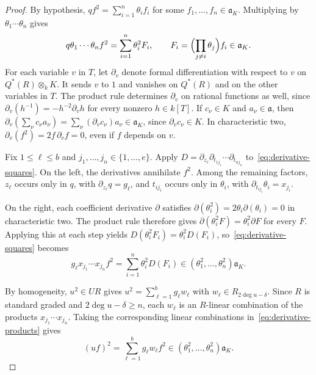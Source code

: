 \documentclass[a4paper,11pt]{amsart}
\newcommand{\kk}{k}
\theoremstyle{definition}
\begin{document}
\begin{proof}
By hypothesis, $qf^2=\sum_{i=1}^n\theta_i f_i$ for some $f_1,\ldots,f_n\in\mathfrak a_K$. Multiplying by $\theta_1\cdots\theta_n$ gives
\begin{equation}\label{eq:derivative-squares}
 q\theta_1\cdots\theta_n f^2=\sum_{i=1}^n\theta_i^2 F_i,\qquad F_i=\Bigl(\prod_{j\ne i}\theta_j\Bigr)f_i\in\mathfrak a_K.
\end{equation}
For each variable $v$ in $T$, let $\partial_v$ denote formal differentiation with respect to $v$ on $Q^*(R)\otimes_{\kk}K$. It sends $v$ to $1$ and vanishes on $Q^*(R)$ and on the other variables in $T$. The product rule determines $\partial_v$ on rational functions as well, since $\partial_v(h^{-1})=-h^{-2}\partial_v h$ for every nonzero $h\in\kk[T]$. If $c_\nu\in K$ and $a_\nu\in\mathfrak a$, then $\partial_v(\sum_\nu c_\nu a_\nu)=\sum_\nu(\partial_v c_\nu)a_\nu\in\mathfrak a_K$, since $\partial_v c_\nu\in K$. In characteristic two, $\partial_v(f^2)=2f\,\partial_v f=0$, even if $f$ depends on $v$.

Fix $1\leq\ell\leq b$ and $j_1,\ldots,j_n\in\{1,\ldots,e\}$. Apply $D=\partial_{z_\ell}\partial_{t_{1j_1}}\cdots\partial_{t_{nj_n}}$ to~\eqref{eq:derivative-squares}. On the left, the derivatives annihilate $f^2$. Among the remaining factors, $z_\ell$ occurs only in $q$, with $\partial_{z_\ell}q=g_\ell$, and $t_{ij_i}$ occurs only in $\theta_i$, with $\partial_{t_{ij_i}}\theta_i=x_{j_i}$.

On the right, each coefficient derivative $\partial$ satisfies $\partial(\theta_i^2)=2\theta_i\partial(\theta_i)=0$ in characteristic two. The product rule therefore gives $\partial(\theta_i^2 F)=\theta_i^2\partial F$ for every $F$. Applying this at each step yields $D(\theta_i^2 F_i)=\theta_i^2D(F_i)$, so~\eqref{eq:derivative-squares} becomes
\begin{equation}\label{eq:derivative-products}
 g_\ell x_{j_1}\cdots x_{j_n}f^2=\sum_{i=1}^n\theta_i^2D(F_i)\in(\theta_1^2,\ldots,\theta_n^2)\mathfrak a_K.
\end{equation}

By homogeneity, $u^2\in UR$ gives $u^2=\sum_{\ell=1}^b g_\ell w_\ell$ with $w_\ell\in R_{2\deg u-\delta}$. Since $R$ is standard graded and $2\deg u-\delta\geq n$, each $w_\ell$ is an $R$-linear combination of the products $x_{j_1}\cdots x_{j_n}$. Taking the corresponding linear combinations in~\eqref{eq:derivative-products} gives
\[
 (uf)^2=\sum_{\ell=1}^b g_\ell w_\ell f^2\in(\theta_1^2,\ldots,\theta_n^2)\mathfrak a_K.
\]


\end{proof}
\end{document}
